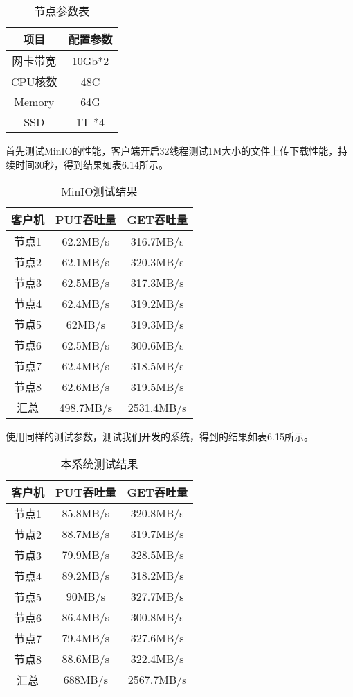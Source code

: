 \begin{table}[h]
    \centering
    \caption{节点参数表}
    \begin{tabular}{cc}
      \toprule
      项目   & 配置参数   \\
      \midrule
      网卡带宽 & 10Gb*2  \\
      CPU核数  & 48C     \\
      Memory  & 64G      \\
      SSD     & 1T *4   \\
      \bottomrule
    \end{tabular}
\end{table}

首先测试MinIO的性能，客户端开启32线程测试1M大小的文件上传下载性能，持续时间30秒，得到结果如表6.14所示。

\begin{table}[h]
    \centering
    \caption{MinIO测试结果}
    \begin{tabular}{ccc}
      \toprule
      客户机   & PUT吞吐量  & GET吞吐量 \\
      \midrule
      节点1  & 62.2MB/s  & 316.7MB/s \\
      节点2  & 62.1MB/s  & 320.3MB/s \\
      节点3  & 62.5MB/s  & 317.3MB/s \\
      节点4  & 62.4MB/s  & 319.2MB/s \\
      节点5  & 62MB/s    & 319.3MB/s \\
      节点6  & 62.5MB/s  & 300.6MB/s \\
      节点7  & 62.4MB/s  & 318.5MB/s \\
      节点8  & 62.6MB/s  & 319.5MB/s \\
      汇总   & 498.7MB/s & 2531.4MB/s \\
      \bottomrule
    \end{tabular}
\end{table}

使用同样的测试参数，测试我们开发的系统，得到的结果如表6.15所示。

\begin{table}[h]
    \centering
    \caption{本系统测试结果}
    \begin{tabular}{ccc}
      \toprule
      客户机   & PUT吞吐量  & GET吞吐量 \\
      \midrule
      节点1  & 85.8MB/s  & 320.8MB/s \\
      节点2  & 88.7MB/s  & 319.7MB/s \\
      节点3  & 79.9MB/s  & 328.5MB/s \\
      节点4  & 89.2MB/s  & 318.2MB/s \\
      节点5  & 90MB/s    & 327.7MB/s \\
      节点6  & 86.4MB/s  & 300.8MB/s \\
      节点7  & 79.4MB/s  & 327.6MB/s \\
      节点8  & 88.6MB/s  & 322.4MB/s \\
      汇总   & 688MB/s   & 2567.7MB/s \\
      \bottomrule
    \end{tabular}
\end{table}

